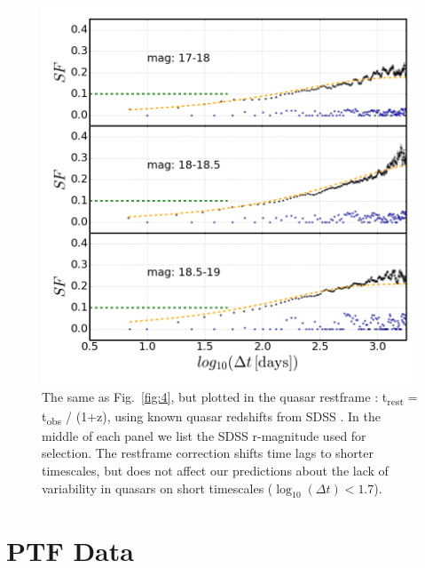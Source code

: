 \documentclass[fleqn,usenatbib]{mnras}  %
\begin{document}
\begin{figure}
\label{fig:5}
 \includegraphics[width=1.1\columnwidth, center]{Fig_5_SF_QSO_starsB_r_cut_rest.png}
 \caption{The same as Fig.~\ref{fig:4}, but plotted in the quasar restframe : t\textsubscript{rest} = t\textsubscript{obs} / (1+z), using known quasar redshifts from SDSS \citep{macleod2010}.   In the middle of each panel we list the SDSS r-magnitude used for selection. The restframe correction shifts time lags to shorter timescales, but does not affect our predictions about the lack of variability in quasars on short timescales ($\log_{10}(\Delta t) < 1.7$).} %
\end{figure}



\section{PTF Data}
\end{document}
